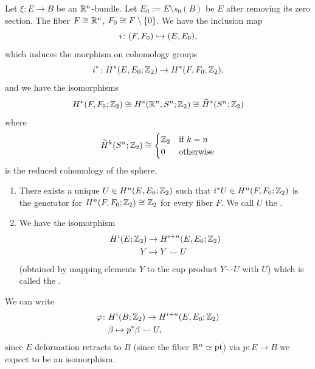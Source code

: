 \begin{notation}
Let $\xi\colon E\to B$ be an $\RR^{n}$-bundle. Let $E_{0}:=E\setminus s_{0}(B)$
be $E$ after removing its zero section. The fiber $F\iso\RR^{n}$,
$F_{0}\iso F\setminus\{0\}$. We have the inclusion map
\begin{equation}
i\colon(F,F_{0})\into(E,E_{0}),
\end{equation}
which induces the morphism on cohomology groups
\begin{equation}
i^{*}\colon H^{*}(E,E_{0};\ZZ_{2})\to H^{*}(F,F_{0};\ZZ_{2}),
\end{equation}
and we have the isomorphisms
\begin{equation}
H^{*}(F,F_{0};\ZZ_{2})\iso H^{*}(\RR^{n},\sphere{n};\ZZ_{2})\iso\widetilde{H}^{*}(\sphere{n};\ZZ_{2})
\end{equation}
where
\begin{equation}
\widetilde{H}^{k}(\sphere{n};\ZZ_{2})\iso\begin{cases}\ZZ_{2} &
\mbox{if }k=n\\
0 & \mbox{otherwise}
\end{cases}
\end{equation}
is the reduced cohomology of the sphere.
\end{notation}

\begin{theorem}[Thom]
\begin{enumerate}
\item There exists a unique $U\in H^{n}(E,E_{0};\ZZ_{2})$ such that
  $i^{*}U\in H^{n}(F,F_{0};\ZZ_{2})$ is the generator for
  $H^{n}(F,F_{0};\ZZ_{2})\iso\ZZ_{2}$ for every fiber $F$. We call $U$
  the .
\item We have the isomorphism
  \begin{align}
     H^{i}(E;\ZZ_{2})&\to H^{i+n}(E,E_{0};\ZZ_{2})\\
 Y&\mapsto Y\smile U\nonumber
  \end{align}
  (obtained by mapping elements $Y$ to the cup product $Y\smile U$
  with $U$) which is called the .
\end{enumerate}
\end{theorem}

\begin{remark}
We can write
\begin{align}
\varphi\colon & H^{i}(B;\ZZ_{2})\to H^{i+n}(E,E_{0};\ZZ_{2})\\
& \beta\mapsto p^{*}\beta\smile U\nonumber,
\end{align}
since $E$ deformation retracts to $B$ (since the fiber
$\RR^{n}\homotopic\point{*}$) via $p\colon E\to B$ we expect to be an isomorphism.
\end{remark}

